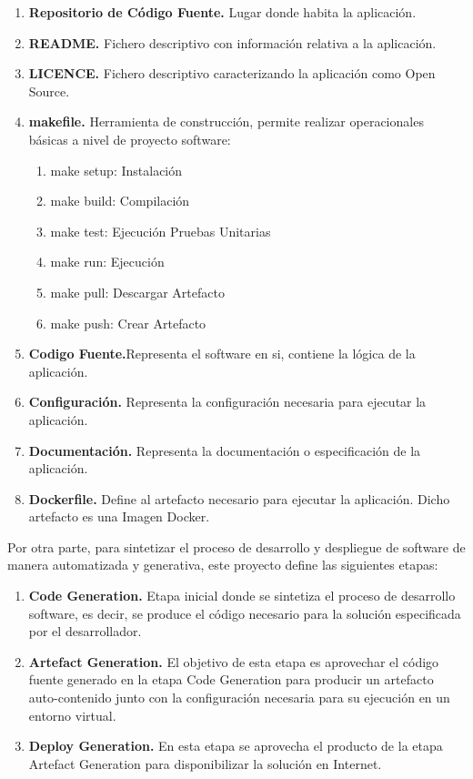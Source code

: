 \documentclass[a4paper,11pt]{book}
\begin{document}
\begin{enumerate}
\item \textbf{ Repositorio de Código Fuente. } Lugar donde habita la aplicación. 
\item \textbf{ README.} Fichero descriptivo con información relativa a  la aplicación. 
\item \textbf{ LICENCE. }Fichero descriptivo caracterizando la aplicación como Open Source. 
\item \textbf{ makefile.} Herramienta  de construcción, permite realizar operacionales básicas a nivel de proyecto software:

  \begin{enumerate}[label*=\arabic*.]
    \item make setup:  Instalación
    \item make build:  Compilación
    \item make test: Ejecución Pruebas Unitarias
   	\item make run: Ejecución
   	\item make pull: Descargar Artefacto
   	\item make push: Crear Artefacto	
  \end{enumerate}
  
  
\item \textbf{ Codigo Fuente.}Representa el software en si, contiene la lógica de la aplicación.  
\item \textbf{ Configuración.} Representa la configuración necesaria para ejecutar la aplicación. 
\item \textbf{ Documentación.} Representa la documentación o especificación de la aplicación. 
\item \textbf{ Dockerfile.} Define al artefacto necesario para ejecutar la aplicación. Dicho artefacto es una Imagen Docker. 
\end{enumerate}




Por otra parte, para sintetizar el proceso de desarrollo y despliegue de software de manera automatizada y generativa, este proyecto define las siguientes etapas: 

\begin{enumerate}
\item \textbf{ Code Generation. }  Etapa inicial donde se sintetiza el proceso de desarrollo software, es decir, se produce el código necesario para la solución especificada por el desarrollador.
\item \textbf{ Artefact Generation. }  El objetivo de esta etapa es aprovechar el código fuente generado en la etapa Code Generation para producir un artefacto auto-contenido junto con la configuración necesaria para su ejecución en un entorno virtual.
\item \textbf{ Deploy Generation. } En esta etapa se aprovecha el producto de la etapa Artefact Generation para disponibilizar la solución en Internet.
\end{enumerate}
\end{document}
